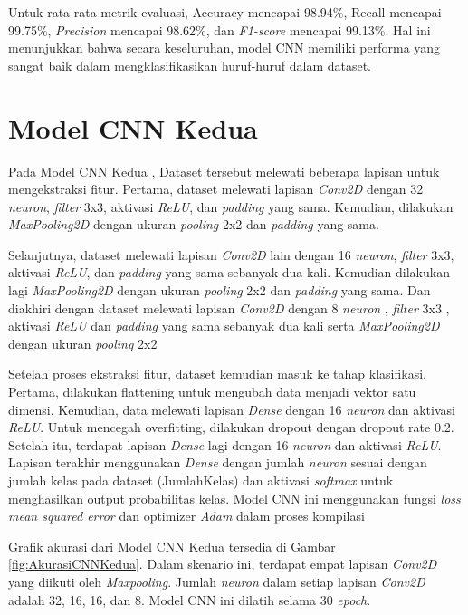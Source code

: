 Untuk rata-rata metrik evaluasi, Accuracy mencapai 98.94\%, Recall mencapai 99.75\%, \textit{Precision} mencapai 98.62\%, dan \textit{F1-score} mencapai 99.13\%. Hal ini menunjukkan bahwa secara keseluruhan, model CNN memiliki performa yang sangat baik dalam mengklasifikasikan huruf-huruf dalam dataset.


\section{Model CNN Kedua}
Pada Model CNN Kedua , Dataset tersebut melewati beberapa lapisan untuk mengekstraksi fitur. Pertama, dataset melewati lapisan \textit{Conv2D} dengan 32 \textit{neuron}, \textit{filter} 3x3, aktivasi \textit{ReLU}, dan \textit{padding} yang sama. Kemudian, dilakukan \textit{MaxPooling2D} dengan ukuran \textit{pooling} 2x2 dan \textit{padding} yang sama.

Selanjutnya, dataset melewati lapisan \textit{Conv2D} lain dengan 16 \textit{neuron}, \textit{filter} 3x3, aktivasi \textit{ReLU}, dan \textit{padding} yang sama sebanyak dua kali. Kemudian dilakukan lagi \textit{MaxPooling2D} dengan ukuran \textit{pooling} 2x2 dan \textit{padding} yang sama. Dan diakhiri dengan dataset melewati lapisan \textit{Conv2D} dengan 8 \textit{neuron} , \textit{filter} 3x3 , aktivasi \textit{ReLU} dan \textit{padding} yang sama sebanyak dua kali serta \textit{MaxPooling2D} dengan ukuran \textit{pooling} 2x2 

Setelah proses ekstraksi fitur, dataset kemudian masuk ke tahap klasifikasi. Pertama, dilakukan flattening untuk mengubah data menjadi vektor satu dimensi. Kemudian, data melewati lapisan \textit{Dense} dengan 16 \textit{neuron} dan aktivasi \textit{ReLU}. Untuk mencegah overfitting, dilakukan dropout dengan dropout rate 0.2. Setelah itu, terdapat lapisan \textit{Dense} lagi dengan 16 \textit{neuron} dan aktivasi \textit{ReLU}. Lapisan terakhir menggunakan \textit{Dense} dengan jumlah \textit{neuron} sesuai dengan jumlah kelas pada dataset (JumlahKelas) dan aktivasi \textit{softmax} untuk menghasilkan output probabilitas kelas. Model CNN ini menggunakan fungsi \textit{loss} \textit{mean squared error} dan optimizer \textit{Adam} dalam proses kompilasi

Grafik akurasi dari Model CNN Kedua tersedia di Gambar \ref{fig:AkurasiCNNKedua}. Dalam skenario ini, terdapat empat lapisan \textit{Conv2D} yang diikuti oleh \textit{Maxpooling}. Jumlah \textit{neuron} dalam setiap lapisan \textit{Conv2D} adalah 32, 16, 16, dan 8. Model CNN ini dilatih selama 30\textit{ epoch}.

